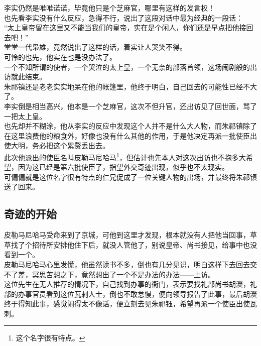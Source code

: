 \begin{multicols}{\theparacolNo}
李实仍然是唯唯诺诺，毕竟他只是个芝麻官，哪里有这样的发言权！\\

也先看李实没有什么反应，急得不行，说出了这段对话中最为经典的一段话：\\

“太上皇帝留在这里又不能当我们的皇帝，实在是个闲人，你们还是早点把他接回去吧！”\\

堂堂一代枭雄，竟然说出了这样的话，着实让人哭笑不得。\\

可怜的也先，他实在也是没办法了。\\

一个不知所谓的使者，一个哭泣的太上皇，一个无奈的部落首领，这场闹剧般的出访就此结束。\\

朱祁镇还是老老实实地呆在他的帐篷里，他终于明白，自己回去的可能性已经不大了。\\

李实倒是相当高兴，他本是一个芝麻官，这次不但升官，还出访见了回世面，骂了一把太上皇。\\

也先却并不糊涂，他从李实的反应中发现这个人并不是什么大人物，而朱祁镇除了在这里浪费他的粮食外，好像也没有什么其他的作用，于是他决定再派一批使臣出使大明，务必把这个累赘丢出去。\\

此次他派出的使臣名叫皮勒马尼哈马\footnote{这个名字很有特点。}，但估计也先本人对这次出访也不抱多大希望，因为这已经是第六批使臣了，指望外交奇迹出现，似乎也不太现实。\\

可偏偏就是这位名字很有特点的仁兄促成了一位关键人物的出场，并最终将朱祁镇送了回来。\\

\subsection{奇迹的开始}
皮勒马尼哈马受命来到了京城，可他到这里才发现，根本就没有人把他当回事，草草找了个招待所安排他住下后，就没人管他了，别说皇帝、尚书接见，给事中也没看到一个。\\

皮勒马尼哈马心里发慌，他虽然读书不多，倒也有几分见识，明白这样下去回去交不了差，冥思苦想之下，竟然想出了一个不是办法的办法——上访。\\

这位先生在无人推荐的情况下，自己找到办事的衙门，表示要找礼部尚书胡濙，礼部的办事官员看到这位瓦剌人士，倒也不敢怠慢，便向领导报告了此事，最后胡濙终于得知此事，感觉闹得太不像话，便立刻去见朱祁钰，希望再派一个使臣出使瓦剌。\\


\end{multicols}
